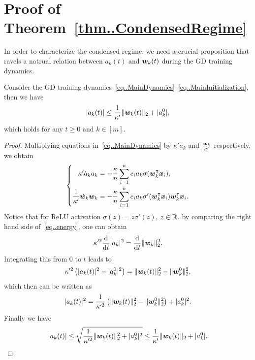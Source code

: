 \documentclass[twoside,11pt]{article}
\begin{document}
\section{Proof of Theorem~\ref{thm..CondensedRegime}}
In order to characterize the condensed regime, we need a crucial proposition that ravels a natrual relation between $a_k(t)$ and $\bm{w}_k(t)$ during the GD training dynamics.
\begin{prop}\label{prop..a-w-est}
    Consider the GD training dynamics~\eqref{eq..MainDynamics}--\eqref{eq..MainInitialization}, then we have
    \begin{equation}
        \lvert a_k(t)\rvert\leq \frac{1}{\kappa'}\lVert\bm{w}_k(t)\rVert_2+\lvert a_k^0\rvert,
    \end{equation}
    which holds for any $t\geq 0$ and $k\in[m]$.
\end{prop}
\begin{proof}
    Multiplying equations in~\eqref{eq..MainDynamics} by $\kappa'a_k$ and $\frac{\bm{w}_k}{\kappa'}$ respectively, we obtain
    \begin{equation}\label{eq..energy}
        \left \{
        \begin{aligned}
            \kappa'\dot{a}_k a_k              & = -\frac{\kappa}{n}\sum_{i=1}^{n}e_i a_k\sigma(\bm{w}_k^\intercal\bm{x}_i),              \\
            \frac{1}{\kappa'}\dot{\bm{w}}_k\bm{w}_k & = -\frac{\kappa}{n}\sum_{i=1}^n e_i a_k\sigma'(\bm{w}_k^\intercal\bm{x}_i)\bm{w}_k^\intercal\bm{x}_i.
        \end{aligned}
        \right.
    \end{equation}
    Notice that for ReLU activation $\sigma(z)=z\sigma'(z)$, $z\in\mathbb{R}$.
    by comparing the right hand side of~\eqref{eq..energy}, one can obtain
    \begin{equation*}
        \kappa'^2\frac{\mathrm{d}}{\mathrm{d} t}\lvert a_k\rvert^2 = \frac{\mathrm{d}}{\mathrm{d} t}\lVert\bm{w}_k\rVert^2_2.
    \end{equation*}
    Integrating this from $0$ to $t$ leads to
    \begin{equation*}
        \kappa'^2\left(\lvert a_k(t)\rvert^2-\lvert a_k^0\rvert^2\right) = \lVert\bm{w}_k(t)\rVert^2_2-\lVert\bm{w}_k^0\rVert^2_2,
    \end{equation*}
    which then can be written as
    \begin{equation}
        \lvert a_k(t)\rvert^2 = \frac{1}{\kappa'^2}\left(\lVert\bm{w}_k(t)\rVert^2_2-\lVert\bm{w}_k^0\rVert^2_2\right) + \lvert a_k^0\rvert^2.
    \end{equation}
    Finally we have
    \begin{equation*}
        \lvert a_k(t)\rvert\leq\sqrt{\frac{1}{\kappa'^2}\lVert\bm{w}_k(t)\rVert^2_2+\lvert a_k^0\rvert^2}
        \leq
        \frac{1}{\kappa'}\lVert\bm{w}_k(t)\rVert_2+\lvert a_k^0\rvert.
    \end{equation*}
\end{proof}
\end{document}
